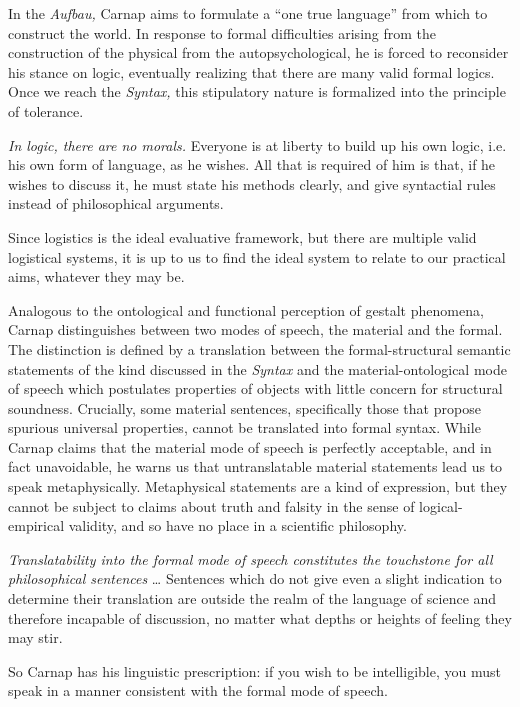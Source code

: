 \documentclass[leqno, 12pt]{turabian-researchpaper}
\begin{document}
	In the \textit{Aufbau,} Carnap aims to formulate a \enquote{one true language}
	from which to construct the world. In response to formal difficulties arising from
	the construction of the physical from the autopsychological, he is forced to
	reconsider his stance on logic, eventually realizing that there are many valid
	formal logics. Once we reach the \textit{Syntax,} this stipulatory nature is formalized
	into the principle of tolerance.
	\begin{displayquote}
		 \emph{In logic, there are no morals.}
		Everyone is at liberty to build up his own logic, i.e. his own form of
		language, as he wishes. All that is required of him is that, if he wishes to
		discuss it, he must state his methods clearly, and give syntactial rules instead
		of philosophical arguments.
	\end{displayquote}
	Since logistics is the ideal evaluative framework, but there are multiple valid
	logistical systems, it is up to us to find the ideal system to relate to our
	practical aims, whatever they may be.

	Analogous to the ontological and functional perception of gestalt phenomena,
	Carnap distinguishes between two modes of speech, the material and the formal.
	The distinction is defined by a translation between the formal-structural
	semantic statements of the kind discussed in the \textit{Syntax} and the material-ontological
	mode of speech which postulates properties of objects with little concern for structural
	soundness. Crucially, some material sentences, specifically those that propose
	spurious universal properties, cannot be translated into formal syntax. While
	Carnap claims that the material mode of speech is perfectly acceptable, and in
	fact unavoidable, he warns us that untranslatable material statements lead us
	to speak metaphysically. Metaphysical statements are a kind of expression, but
	they cannot be subject to claims about truth and falsity in the sense of
	logical-empirical validity, and so have no place in a scientific philosophy.
	\begin{displayquote}
		 \emph{Translatability into the formal mode
		of speech constitutes the touchstone for all philosophical sentences} \dots
		Sentences which do not give even a slight indication to determine their
		translation are outside the realm of the language of science and therefore
		incapable of discussion, no matter what depths or heights of feeling they may
		stir.
	\end{displayquote}
	So Carnap has his linguistic prescription: if you wish to be intelligible, you
	must speak in a manner consistent with the formal mode of speech.
\end{document}
